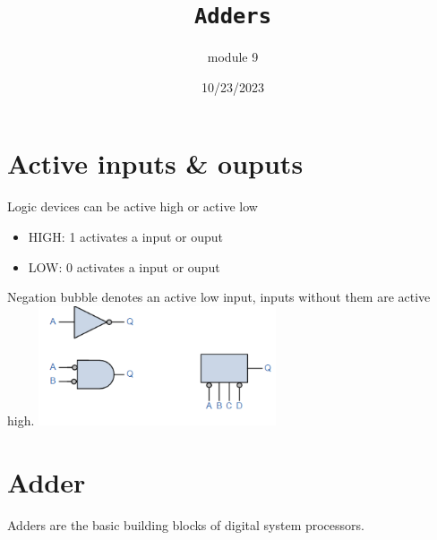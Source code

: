 \documentclass[a4paper,12pt]{article}
\title{\texttt{Adders}\\\hrulefill}
\author{module 9}
\date{\small{10/23/2023}}
\begin{document}
    \maketitle

    \section{Active inputs \& ouputs}
        Logic devices can be active high or active low
        \begin{itemize}
            \item HIGH: 1 activates a input or ouput
            \item LOW: 0 activates a input or ouput 
        \end{itemize}
        Negation bubble denotes an active low input, inputs without them are active high.
        \includegraphics[width=7cm]{Negationbubble.png}

    \section{Adder}
        Adders are the basic building blocks of digital system processors.
\end{document}
